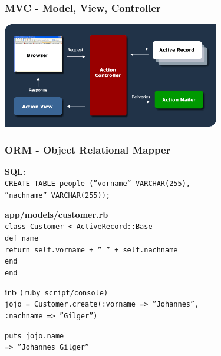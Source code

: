 \begin{frame}
  \frametitle{MVC - Model, View, Controller}
  \begin{center}
    \includegraphics[width=9.5cm]{img/mvc_rails.png}
  \end{center}
\end{frame}

\begin{frame}
  \frametitle{ORM - Object Relational Mapper}
  {\bf \small SQL:} \\
  {\tt \small CREATE TABLE people (''vorname'' VARCHAR(255),} \\
  {\tt \small \enskip ''nachname'' VARCHAR(255));} \\
  \vspace{0.3cm}
  \pause
  
  {\bf \small app/models/customer.rb} \\
  {\tt \small class Customer < ActiveRecord::Base} \\
  {\tt \small \enskip def name} \\
  {\tt \small \enskip \enskip return self.vorname + '' '' + self.nachname} \\
  {\tt \small \enskip end} \\
  {\tt \small end} \\
  \vspace{0.3cm}
  \pause

  {\bf \small irb} {\small \tt (ruby script/console)} \\
  {\tt \small jojo = Customer.create(:vorname => ''Johannes'',} \\
  {\tt \small \enskip :nachname => ''Gilger'')} \\
  \vspace{0.3cm}
  \pause

  {\tt \small puts jojo.name} \\
  {\tt \small {\color{green}=> ''Johannes Gilger''}}
\end{frame}

